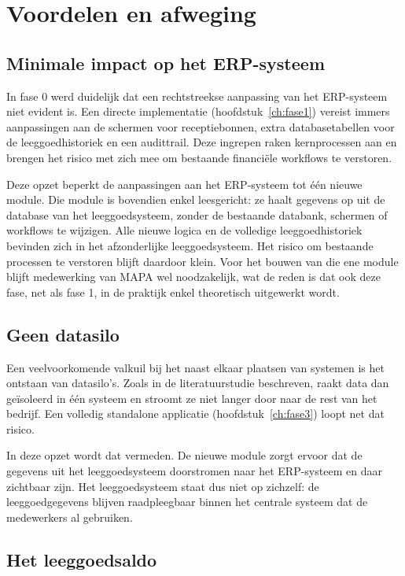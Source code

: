 \section{Voordelen en afweging}

\subsection{Minimale impact op het ERP-systeem}

In fase 0 werd duidelijk dat een rechtstreekse aanpassing van het ERP-systeem niet evident is. Een directe implementatie (hoofdstuk~\ref{ch:fase1}) vereist immers aanpassingen aan de schermen voor receptiebonnen, extra databasetabellen voor de leeggoedhistoriek en een audittrail. Deze ingrepen raken kernprocessen aan en brengen het risico met zich mee om bestaande financiële workflows te verstoren.

Deze opzet beperkt de aanpassingen aan het ERP-systeem tot één nieuwe module. Die module is bovendien enkel leesgericht: ze haalt gegevens op uit de database van het leeggoedsysteem, zonder de bestaande databank, schermen of workflows te wijzigen. Alle nieuwe logica en de volledige leeggoedhistoriek bevinden zich in het afzonderlijke leeggoedsysteem. Het risico om bestaande processen te verstoren blijft daardoor klein. Voor het bouwen van die ene module blijft medewerking van MAPA wel noodzakelijk, wat de reden is dat ook deze fase, net als fase 1, in de praktijk enkel theoretisch uitgewerkt wordt.

\subsection{Geen datasilo}

Een veelvoorkomende valkuil bij het naast elkaar plaatsen van systemen is het ontstaan van datasilo's. Zoals in de literatuurstudie beschreven, raakt data dan geïsoleerd in één systeem en stroomt ze niet langer door naar de rest van het bedrijf. Een volledig standalone applicatie (hoofdstuk~\ref{ch:fase3}) loopt net dat risico.

In deze opzet wordt dat vermeden. De nieuwe module zorgt ervoor dat de gegevens uit het leeggoedsysteem doorstromen naar het ERP-systeem en daar zichtbaar zijn. Het leeggoedsysteem staat dus niet op zichzelf: de leeggoedgegevens blijven raadpleegbaar binnen het centrale systeem dat de medewerkers al gebruiken.

\subsection{Het leeggoedsaldo}

